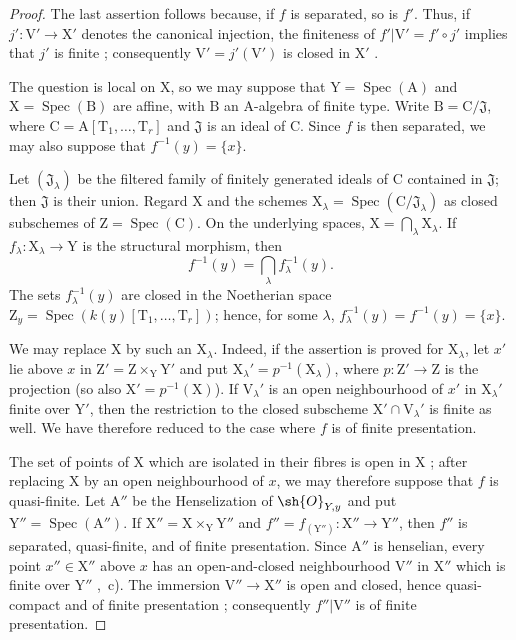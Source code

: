 \begin{proof}
The last assertion follows because, if $f$ is separated, so is $f'$. Thus, if $j':\mathrm{V}'\to\mathrm{X}'$ denotes the canonical injection, the finiteness of $f'|\mathrm{V}'=f'\circ j'$ implies that $j'$ is finite ; consequently $\mathrm{V}'=j'(\mathrm{V}')$ is closed in $\mathrm{X}'$ .

The question is local on $\mathrm{X}$, so we may suppose that $\mathrm{Y}=\operatorname{Spec}(\mathrm{A})$ and $\mathrm{X}=\operatorname{Spec}(\mathrm{B})$ are affine, with $\mathrm{B}$ an $\mathrm{A}$-algebra of finite type. Write $\mathrm{B}=\mathrm{C}/\mathfrak{J}$, where $\mathrm{C}=\mathrm{A}[\mathrm{T}_1,\ldots,\mathrm{T}_r]$ and $\mathfrak{J}$ is an ideal of $\mathrm{C}$. Since $f$ is then separated, we may also suppose that $f^{-1}(y)=\{x\}$.

Let $(\mathfrak{J}_\lambda)$ be the filtered family of finitely generated ideals of $\mathrm{C}$ contained in $\mathfrak{J}$; then $\mathfrak{J}$ is their union. Regard $\mathrm{X}$ and the schemes $\mathrm{X}_\lambda=\operatorname{Spec}(\mathrm{C}/\mathfrak{J}_\lambda)$ as closed subschemes of $\mathrm{Z}=\operatorname{Spec}(\mathrm{C})$. On the underlying spaces, $\mathrm{X}=\bigcap_\lambda\mathrm{X}_\lambda$. If $f_\lambda:\mathrm{X}_\lambda\to\mathrm{Y}$ is the structural morphism, then
\[
  f^{-1}(y)=\bigcap_\lambda f_\lambda^{-1}(y).
\]
The sets $f_\lambda^{-1}(y)$ are closed in the Noetherian space $\mathrm{Z}_y=\operatorname{Spec}(k(y)[\mathrm{T}_1,\ldots,\mathrm{T}_r])$; hence, for some $\lambda$, $f_\lambda^{-1}(y)=f^{-1}(y)=\{x\}$.

We may replace $\mathrm{X}$ by such an $\mathrm{X}_\lambda$. Indeed, if the assertion is proved for $\mathrm{X}_\lambda$, let $x'$ lie above $x$ in $\mathrm{Z}'=\mathrm{Z}\times_{\mathrm{Y}}\mathrm{Y}'$ and put $\mathrm{X}_\lambda'=p^{-1}(\mathrm{X}_\lambda)$, where $p:\mathrm{Z}'\to\mathrm{Z}$ is the projection (so also $\mathrm{X}'=p^{-1}(\mathrm{X})$). If $\mathrm{V}_\lambda'$ is an open neighbourhood of $x'$ in $\mathrm{X}_\lambda'$ finite over $\mathrm{Y}'$, then the restriction to the closed subscheme $\mathrm{X}'\cap\mathrm{V}_\lambda'$ is finite as well. We have therefore reduced to the case where $f$ is of finite presentation.

The set of points of $\mathrm{X}$ which are isolated in their fibres is open in $\mathrm{X}$ ; after replacing $\mathrm{X}$ by an open neighbourhood of $x$, we may therefore suppose that $f$ is quasi-finite. Let $\mathrm{A}''$ be the Henselization of $\sh{O}_{Y,y}$ and put $\mathrm{Y}''=\operatorname{Spec}(\mathrm{A}'')$. If $\mathrm{X}''=\mathrm{X}\times_{\mathrm{Y}}\mathrm{Y}''$ and $f''=f_{(\mathrm{Y}'')}:\mathrm{X}''\to\mathrm{Y}''$, then $f''$ is separated, quasi-finite, and of finite presentation. Since $\mathrm{A}''$ is henselian, every point $x''\in\mathrm{X}''$ above $x$ has an open-and-closed neighbourhood $\mathrm{V}''$ in $\mathrm{X}''$ which is finite over $\mathrm{Y}''$ ,~c). The immersion $\mathrm{V}''\to\mathrm{X}''$ is open and closed, hence quasi-compact and of finite presentation ; consequently $f''|\mathrm{V}''$ is of finite presentation.


\end{proof}
